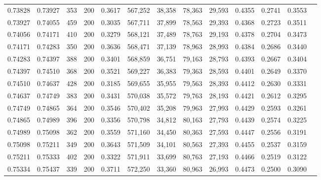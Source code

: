 \begin{tabular}{rrrrrrrrrrrrr}
0.73828 & 0.73927 &    353 & 200 &                                     0.3617 & 567,252 &  38,358 &  78,363 &  29,593 & 0.4355 & 0.2741 & 0.3553 \\
0.73927 & 0.74055 &    459 & 200 &                                     0.3035 & 567,711 &  37,899 &  78,563 &  29,393 & 0.4368 & 0.2723 & 0.3511 \\
0.74056 & 0.74171 &    410 & 200 &                                     0.3279 & 568,121 &  37,489 &  78,763 &  29,193 & 0.4378 & 0.2704 & 0.3473 \\
0.74171 & 0.74283 &    350 & 200 &                                     0.3636 & 568,471 &  37,139 &  78,963 &  28,993 & 0.4384 & 0.2686 & 0.3440 \\
0.74283 & 0.74397 &    388 & 200 &                                     0.3401 & 568,859 &  36,751 &  79,163 &  28,793 & 0.4393 & 0.2667 & 0.3404 \\
0.74397 & 0.74510 &    368 & 200 &                                     0.3521 & 569,227 &  36,383 &  79,363 &  28,593 & 0.4401 & 0.2649 & 0.3370 \\
0.74510 & 0.74637 &    428 & 200 &                                     0.3185 & 569,655 &  35,955 &  79,563 &  28,393 & 0.4412 & 0.2630 & 0.3331 \\
0.74637 & 0.74749 &    383 & 200 &                                     0.3431 & 570,038 &  35,572 &  79,763 &  28,193 & 0.4421 & 0.2612 & 0.3295 \\
0.74749 & 0.74865 &    364 & 200 &                                     0.3546 & 570,402 &  35,208 &  79,963 &  27,993 & 0.4429 & 0.2593 & 0.3261 \\
0.74865 & 0.74989 &    396 & 200 &                                     0.3356 & 570,798 &  34,812 &  80,163 &  27,793 & 0.4439 & 0.2574 & 0.3225 \\
0.74989 & 0.75098 &    362 & 200 &                                     0.3559 & 571,160 &  34,450 &  80,363 &  27,593 & 0.4447 & 0.2556 & 0.3191 \\
0.75098 & 0.75211 &    349 & 200 &                                     0.3643 & 571,509 &  34,101 &  80,563 &  27,393 & 0.4455 & 0.2537 & 0.3159 \\
0.75211 & 0.75333 &    402 & 200 &                                     0.3322 & 571,911 &  33,699 &  80,763 &  27,193 & 0.4466 & 0.2519 & 0.3122 \\
0.75334 & 0.75437 &    339 & 200 &                                     0.3711 & 572,250 &  33,360 &  80,963 &  26,993 & 0.4473 & 0.2500 & 0.3090 \\

\end{tabular}
